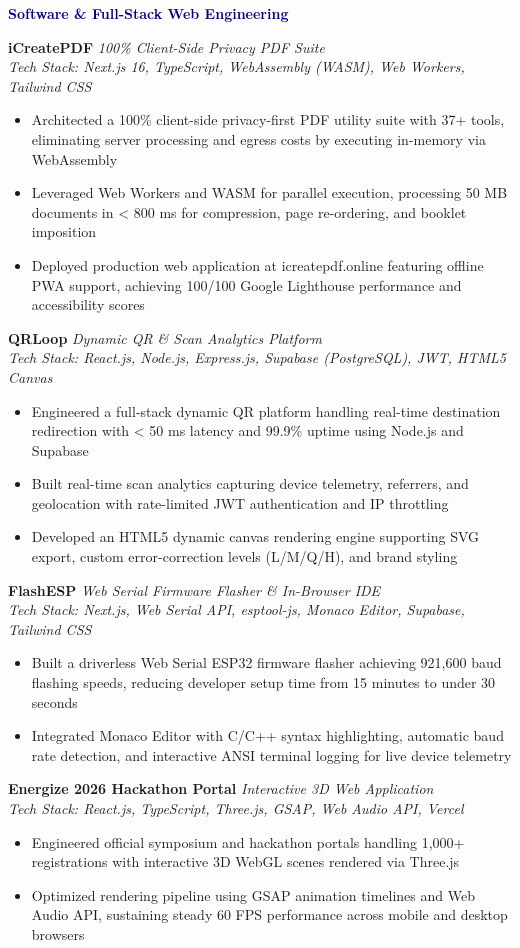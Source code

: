 \documentclass[a4paper,10pt]{article}
\newcommand{\resumeItem}[1]{\item #1}
\newenvironment{resumeItemize}{\begin{itemize}[leftmargin=*, itemsep=0.5pt, topsep=0.8pt]}{\end{itemize}}
\newcommand{\resumeProject}[3]{
  \textbf{#1} \hfill \textit{#2} \\
  \textit{Tech Stack: #3}
}
\newcommand{\resumeSubSection}[1]{%
  \vspace{3pt}%
  \noindent\textbf{\textcolor{darkblue}{#1}}\par\vspace{1.5pt}%
}
\begin{document}
\resumeSubSection{Software \& Full-Stack Web Engineering}
\resumeProject{iCreatePDF}{100\% Client-Side Privacy PDF Suite}{Next.js 16, TypeScript, WebAssembly (WASM), Web Workers, Tailwind CSS}
\begin{resumeItemize}
    \resumeItem{Architected a 100\% client-side privacy-first PDF utility suite with 37+ tools, eliminating server processing and egress costs by executing in-memory via WebAssembly}
    \resumeItem{Leveraged Web Workers and WASM for parallel execution, processing 50 MB documents in < 800 ms for compression, page re-ordering, and booklet imposition}
    \resumeItem{Deployed production web application at icreatepdf.online featuring offline PWA support, achieving 100/100 Google Lighthouse performance and accessibility scores}
\end{resumeItemize}
\vspace{1.6pt}

\resumeProject{QRLoop}{Dynamic QR \& Scan Analytics Platform}{React.js, Node.js, Express.js, Supabase (PostgreSQL), JWT, HTML5 Canvas}
\begin{resumeItemize}
    \resumeItem{Engineered a full-stack dynamic QR platform handling real-time destination redirection with < 50 ms latency and 99.9\% uptime using Node.js and Supabase}
    \resumeItem{Built real-time scan analytics capturing device telemetry, referrers, and geolocation with rate-limited JWT authentication and IP throttling}
    \resumeItem{Developed an HTML5 dynamic canvas rendering engine supporting SVG export, custom error-correction levels (L/M/Q/H), and brand styling}
\end{resumeItemize}
\vspace{1.6pt}

\resumeProject{FlashESP}{Web Serial Firmware Flasher \& In-Browser IDE}{Next.js, Web Serial API, esptool-js, Monaco Editor, Supabase, Tailwind CSS}
\begin{resumeItemize}
    \resumeItem{Built a driverless Web Serial ESP32 firmware flasher achieving 921,600 baud flashing speeds, reducing developer setup time from 15 minutes to under 30 seconds}
    \resumeItem{Integrated Monaco Editor with C/C++ syntax highlighting, automatic baud rate detection, and interactive ANSI terminal logging for live device telemetry}
\end{resumeItemize}
\vspace{1.6pt}

\resumeProject{Energize 2026 Hackathon Portal}{Interactive 3D Web Application}{React.js, TypeScript, Three.js, GSAP, Web Audio API, Vercel}
\begin{resumeItemize}
    \resumeItem{Engineered official symposium and hackathon portals handling 1,000+ registrations with interactive 3D WebGL scenes rendered via Three.js}
    \resumeItem{Optimized rendering pipeline using GSAP animation timelines and Web Audio API, sustaining steady 60 FPS performance across mobile and desktop browsers}
\end{resumeItemize}
\vspace{1.6pt}
\end{document}
